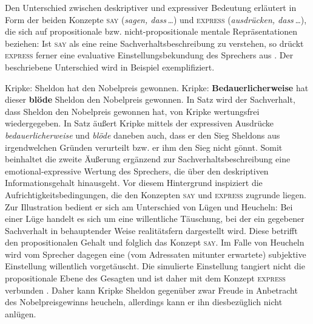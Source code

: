 Den Unterschied zwischen deskriptiver und expressiver Bedeutung erläutert \citet[319f.]{Lang.1983} in Form der beiden Konzepte \textsc{say} (\textit{sagen, dass\,\dots}) und \textsc{express} (\textit{ausdrücken, dass\,\dots}), die sich auf propositionale bzw. nicht-propositionale mentale Repräsentationen beziehen: Ist \textsc{say} als eine reine Sachverhaltsbeschreibung zu verstehen, so drückt \textsc{express} ferner eine evaluative Einstellungsbekundung des Sprechers aus \citep[vgl.][315]{Lang.1983}. Der beschriebene Unterschied wird in Beispiel  exemplifiziert.

 \ea  \label{nobel}
 \ea Kripke: \glqq{}Sheldon hat den Nobelpreis gewonnen.\grqq{} \label{nobel1}
 \ex Kripke: \glqq{}\textbf{Bedauerlicherweise} hat dieser \textbf{blöde} Sheldon den Nobelpreis gewonnen.\grqq{} \label{nobel2}
 \z
 \z
In Satz  wird der Sachverhalt, dass Sheldon den Nobelpreis gewonnen hat, von Kripke wertungsfrei wiedergegeben. {In Satz } äußert Kripke mittels der expressiven Ausdrücke \textit{bedauerlicherweise} und \textit{blöde} daneben auch, dass er den Sieg Sheldons aus irgendwelchen Gründen verurteilt bzw. er ihm den Sieg nicht gönnt. Somit beinhaltet die zweite Äußerung ergänzend zur Sachverhaltsbeschreibung eine emotional-expressive Wertung des Sprechers, die über den deskriptiven Informationsgehalt hinausgeht. Vor diesem Hintergrund inspiziert {\citet[333f.]{Lang.1983}} die Aufrichtigkeitsbedingungen, die den Konzepten \textsc{say} und \textsc{express} zugrunde liegen. Zur Illustration bedient er sich am Unterschied von Lügen und Heucheln: Bei einer Lüge handelt es sich um eine willentliche Täuschung, bei der ein gegebener Sachverhalt in behauptender Weise realitätsfern dargestellt wird. Diese betrifft den propositionalen Gehalt und folglich das Konzept \textsc{say}. Im Falle von Heucheln wird vom Sprecher dagegen eine (vom Adressaten mitunter erwartete) subjektive Einstellung willentlich vorgetäuscht. Die simulierte Einstellung tangiert nicht die propositionale Ebene des Gesagten und ist daher mit dem Konzept \textsc{express} verbunden \citep[vgl.][334]{Lang.1983}. Daher kann Kripke Sheldon gegenüber zwar Freude in Anbetracht des Nobelpreisgewinns heucheln, allerdings kann er ihn diesbezüglich nicht anlügen.

